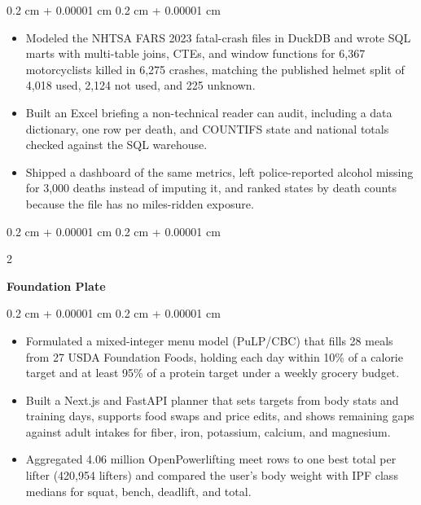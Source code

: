 \documentclass[10pt, letterpaper]{article}
\newenvironment{highlights}{
    \begin{itemize}[
        topsep=0.10 cm,
        parsep=0.10 cm,
        partopsep=0pt,
        itemsep=0pt,
        leftmargin=0.4 cm + 10pt
    ]
}{
    \end{itemize}
} %
\newenvironment{onecolentry}{
    \begin{adjustwidth}{
        0.2 cm + 0.00001 cm
    }{
        0.2 cm + 0.00001 cm
    }
}{
    \end{adjustwidth}
} %
\newenvironment{twocolentry}[2][]{
    \onecolentry
    \def\secondColumn{#2}
    \setcolumnwidth{\fill, 4.5 cm}
    \begin{paracol}{2}
}{
    \switchcolumn \raggedleft \secondColumn
    \end{paracol}
    \endonecolentry
} %
\let\hrefWithoutArrow\href
\renewcommand{\href}[2]{\hrefWithoutArrow{#1}{\ifthenelse{\equal{#2}{}}{ }{#2 }\raisebox{.15ex}{\footnotesize \faExternalLink*}}}
\begin{document}
        \vspace{0.10 cm}
        \begin{onecolentry}
            \begin{highlights}
                \item Modeled the NHTSA FARS 2023 fatal-crash files in DuckDB and wrote SQL marts with multi-table joins, CTEs, and window functions for 6,367 motorcyclists killed in 6,275 crashes, matching the published helmet split of 4,018 used, 2,124 not used, and 225 unknown.
                \item Built an Excel briefing a non-technical reader can audit, including a data dictionary, one row per death, and COUNTIFS state and national totals checked against the SQL warehouse.
                \item Shipped a dashboard of the same metrics, left police-reported alcohol missing for 3,000 deaths instead of imputing it, and ranked states by death counts because the file has no miles-ridden exposure.
            \end{highlights}
        \end{onecolentry}


        \vspace{0.2 cm}

        \begin{twocolentry}{
            
            
        \textit{\href{https://github.com/afshaalzubair/foundation-plate}{Github Repo}}}
            \textbf{Foundation Plate}
        \end{twocolentry}

        \vspace{0.10 cm}
        \begin{onecolentry}
            \begin{highlights}
                \item Formulated a mixed-integer menu model (PuLP/CBC) that fills 28 meals from 27 USDA Foundation Foods, holding each day within 10\% of a calorie target and at least 95\% of a protein target under a weekly grocery budget.
                \item Built a Next.js and FastAPI planner that sets targets from body stats and training days, supports food swaps and price edits, and shows remaining gaps against adult intakes for fiber, iron, potassium, calcium, and magnesium.
                \item Aggregated 4.06 million OpenPowerlifting meet rows to one best total per lifter (420,954 lifters) and compared the user’s body weight with IPF class medians for squat, bench, deadlift, and total.
            \end{highlights}
        \end{onecolentry}
\end{document}
